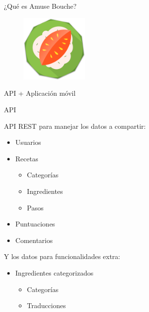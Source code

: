 \documentclass[10pt,xcolor=svgnames]{beamer}
\begin{document}
\begin{frame}{¿Qué es Amuse Bouche?}

  \begin{figure}[H]
    \centering
    \includegraphics[width=0.3\textwidth]{./img/logotipo}
  \end{figure}

  \begin{center}
    API + Aplicación móvil
  \end{center}
  
\end{frame}

\begin{frame}{API}

  API REST para manejar los datos a compartir:
  
  \begin{itemize}
  \item Usuarios
  \item Recetas
    \begin{itemize}
    \item Categorías
    \item Ingredientes
    \item Pasos      
    \end{itemize}
  \item Puntuaciones
  \item Comentarios
  \end{itemize}

  Y los datos para funcionalidades extra:
  \begin{itemize}
  \item Ingredientes categorizados
    \begin{itemize}
    \item Categorías
    \item Traducciones
    \end{itemize}
  \end{itemize}
  
\end{frame}
\end{document}
